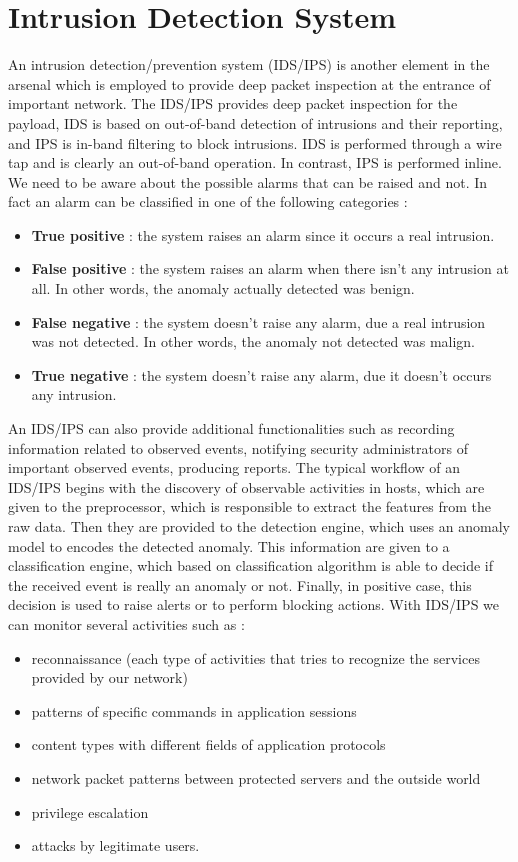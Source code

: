 \documentclass[11pt]{article}
\begin{document}
\section{Intrusion Detection System}
An intrusion detection/prevention system (IDS/IPS) is another element in the arsenal which is employed to provide deep packet inspection at the entrance of important network. The IDS/IPS provides deep packet inspection for the payload, IDS is based on out-of-band detection of intrusions and their reporting, and IPS is in-band filtering to block intrusions. IDS is performed through a wire tap and is clearly an out-of-band operation. In contrast, IPS is performed inline. We need to be aware about the possible alarms that can be raised and not. In fact an alarm can be classified in one of the following categories :
\begin{itemize}
\item \textbf{True positive} : the system raises an alarm since it occurs a real intrusion.
\item \textbf{False positive} : the system raises an alarm when there isn't any intrusion at all. In other words, the anomaly actually detected was benign.
\item \textbf{False negative} : the system doesn't raise any alarm, due a real intrusion was not detected. In other words, the anomaly not detected was malign.
\item \textbf{True negative} : the system doesn't raise any alarm, due it doesn't occurs any intrusion.
\end{itemize}
An IDS/IPS can also provide additional functionalities such as recording information related to observed events, notifying security administrators of important observed events, producing reports. The typical workflow of an IDS/IPS begins with the discovery of observable activities in hosts, which are given to the preprocessor, which is responsible to extract the features from the raw data. Then they are provided to the detection engine, which uses an anomaly model to encodes the detected anomaly.
This information are given to a classification engine, which based on classification algorithm is able to decide if the received event is really an anomaly or not. Finally, in positive case, this decision is used to raise alerts or to perform blocking actions. With IDS/IPS we can monitor several activities such as :
\begin{itemize}
\item reconnaissance (each type of activities that tries to recognize the services provided by our network)
\item patterns of specific commands in application sessions
\item content types with different fields of application protocols
\item network packet patterns between protected servers and the outside world
\item privilege escalation
\item attacks by legitimate users.
\end{itemize}
\end{document}
